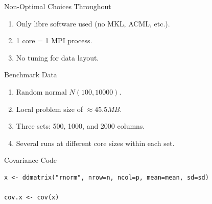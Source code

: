 \begin{frame}
  \begin{block}{Non-Optimal Choices Throughout}
    \begin{enumerate}[<+-|alert@+>]
      \item Only libre software used (no MKL, ACML, etc.).
      \item 1 core = 1 MPI process.
      \item No tuning for data layout.
    \end{enumerate}
  \end{block}
  \begin{block}{Benchmark Data}
    \begin{enumerate}[<+-|alert@+>]
      \item Random normal $N(100, 10000)$.
      \item Local problem size of $\approx 45.5 MB$.
      \item Three sets:  500, 1000, and 2000 columns.
      \item Several runs at different core sizes within each set.
    \end{enumerate}
  \end{block}
\end{frame}




\begin{frame}[fragile]
  \begin{block}{Covariance Code}
\begin{lstlisting}
x <- ddmatrix("rnorm", nrow=n, ncol=p, mean=mean, sd=sd)

cov.x <- cov(x)
\end{lstlisting}
  \end{block}
\end{frame}

